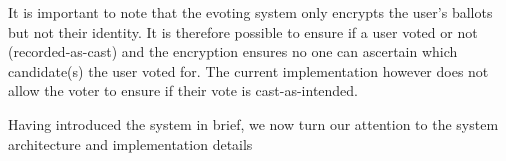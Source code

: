 It is important to note that the evoting system only encrypts the user's ballots but not their identity. It is therefore possible to ensure if a user voted or not (recorded-as-cast) and the encryption ensures no one can ascertain which candidate(s) the user voted for. The current implementation however does not allow the voter to ensure if their vote is cast-as-intended.

Having introduced the system in brief, we now turn our attention to the system architecture and implementation details